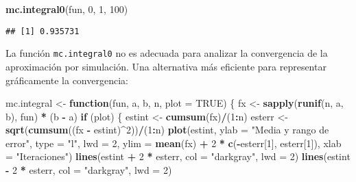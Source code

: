 \documentclass[
]{book}
\newenvironment{Shaded}{\begin{snugshade}}{\end{snugshade}}
\newcommand{\ControlFlowTok}[1]{\textcolor[rgb]{0.13,0.29,0.53}{\textbf{#1}}}
\newcommand{\DataTypeTok}[1]{\textcolor[rgb]{0.13,0.29,0.53}{#1}}
\newcommand{\DecValTok}[1]{\textcolor[rgb]{0.00,0.00,0.81}{#1}}
\newcommand{\KeywordTok}[1]{\textcolor[rgb]{0.13,0.29,0.53}{\textbf{#1}}}
\newcommand{\NormalTok}[1]{#1}
\newcommand{\OperatorTok}[1]{\textcolor[rgb]{0.81,0.36,0.00}{\textbf{#1}}}
\newcommand{\OtherTok}[1]{\textcolor[rgb]{0.56,0.35,0.01}{#1}}
\newcommand{\StringTok}[1]{\textcolor[rgb]{0.31,0.60,0.02}{#1}}
\theoremstyle{break}
\theoremstyle{definition}
\theoremstyle{definition}
\theoremstyle{definition}
\theoremstyle{remark}
\begin{document}
\begin{Shaded}
\begin{Highlighting}[]
\KeywordTok{mc.integral0}\NormalTok{(fun, }\DecValTok{0}\NormalTok{, }\DecValTok{1}\NormalTok{, }\DecValTok{100}\NormalTok{)}
\end{Highlighting}
\end{Shaded}

\begin{verbatim}
## [1] 0.935731
\end{verbatim}

La función \texttt{mc.integral0} no es adecuada para analizar la convergencia
de la aproximación por simulación.
Una alternativa más eficiente para representar gráficamente la convergencia:

\begin{Shaded}
\begin{Highlighting}[]
\NormalTok{  mc.integral <-}\StringTok{ }\ControlFlowTok{function}\NormalTok{(fun, a, b, n, }\DataTypeTok{plot =} \OtherTok{TRUE}\NormalTok{) \{}
\NormalTok{    fx <-}\StringTok{ }\KeywordTok{sapply}\NormalTok{(}\KeywordTok{runif}\NormalTok{(n, a, b), fun) }\OperatorTok{*}\StringTok{ }\NormalTok{(b }\OperatorTok{-}\StringTok{ }\NormalTok{a)}
    \ControlFlowTok{if}\NormalTok{ (plot) \{}
\NormalTok{      estint <-}\StringTok{ }\KeywordTok{cumsum}\NormalTok{(fx)}\OperatorTok{/}\NormalTok{(}\DecValTok{1}\OperatorTok{:}\NormalTok{n)}
\NormalTok{      esterr <-}\StringTok{ }\KeywordTok{sqrt}\NormalTok{(}\KeywordTok{cumsum}\NormalTok{((fx }\OperatorTok{-}\StringTok{ }\NormalTok{estint)}\OperatorTok{^}\DecValTok{2}\NormalTok{))}\OperatorTok{/}\NormalTok{(}\DecValTok{1}\OperatorTok{:}\NormalTok{n)}
      \KeywordTok{plot}\NormalTok{(estint, }\DataTypeTok{ylab =} \StringTok{"Media y rango de error"}\NormalTok{, }\DataTypeTok{type =} \StringTok{"l"}\NormalTok{, }\DataTypeTok{lwd =} \DecValTok{2}\NormalTok{, }\DataTypeTok{ylim =} \KeywordTok{mean}\NormalTok{(fx) }\OperatorTok{+}\StringTok{ }
\StringTok{             }\DecValTok{2} \OperatorTok{*}\StringTok{ }\KeywordTok{c}\NormalTok{(}\OperatorTok{-}\NormalTok{esterr[}\DecValTok{1}\NormalTok{], esterr[}\DecValTok{1}\NormalTok{]), }\DataTypeTok{xlab =} \StringTok{"Iteraciones"}\NormalTok{)}
      \KeywordTok{lines}\NormalTok{(estint }\OperatorTok{+}\StringTok{ }\DecValTok{2} \OperatorTok{*}\StringTok{ }\NormalTok{esterr, }\DataTypeTok{col =} \StringTok{"darkgray"}\NormalTok{, }\DataTypeTok{lwd =} \DecValTok{2}\NormalTok{)}
      \KeywordTok{lines}\NormalTok{(estint }\OperatorTok{-}\StringTok{ }\DecValTok{2} \OperatorTok{*}\StringTok{ }\NormalTok{esterr, }\DataTypeTok{col =} \StringTok{"darkgray"}\NormalTok{, }\DataTypeTok{lwd =} \DecValTok{2}\NormalTok{)}

\end{Highlighting}
\end{Shaded}
\end{document}
